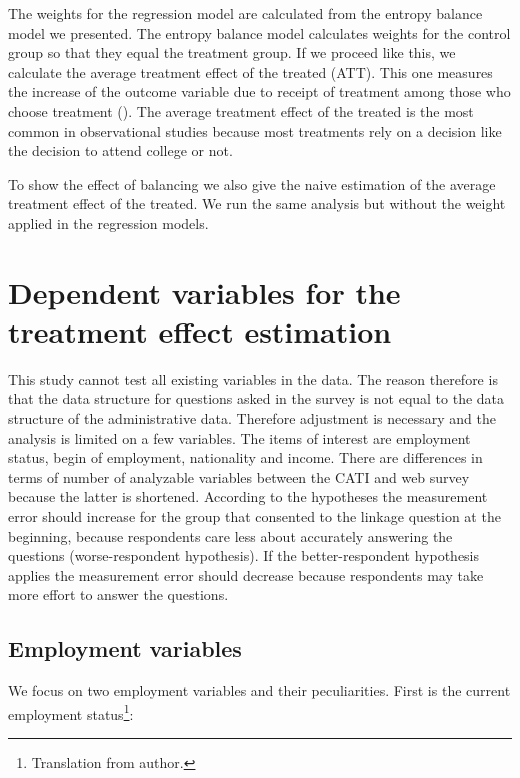 The weights for the regression model are calculated from the entropy balance model we presented. The entropy balance model calculates weights for the control group so that they equal the treatment group. If we proceed like this, we calculate the average treatment effect of the treated (ATT). This one measures the increase of the outcome variable due to receipt of treatment among those who choose treatment (\cite{Eckmanetal15a}). The average treatment effect of the treated is the most common in observational studies because most treatments rely on a decision like the decision to attend college or not.

To show the effect of balancing we also give the naive estimation of the average treatment effect of the treated. We run the same analysis but without the weight applied in the regression models.

\section{Dependent variables for the treatment effect estimation}\label{variables}

This study cannot test all existing variables in the data. The reason therefore is that the data structure for questions asked in the survey is not equal to the data structure of the administrative data. Therefore adjustment is necessary and the analysis is limited on a few variables. The items of interest are employment status, begin of employment, nationality and income. There are differences in terms of number of analyzable variables between the CATI and web survey because the latter is shortened. According to the hypotheses the measurement error should increase for the group that consented to the linkage question at the beginning, because respondents care less about accurately answering the questions (worse-respondent hypothesis). If the better-respondent hypothesis applies the measurement error should decrease because respondents may take more effort to answer the questions.

\subsection{Employment variables}

We focus on two employment variables and their peculiarities. First is the current employment status\footnote{Translation from author.}:

